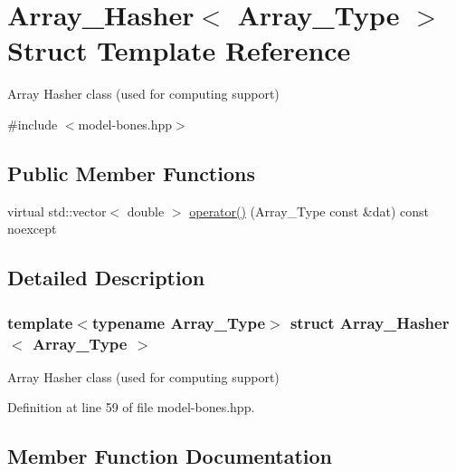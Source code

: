 \hypertarget{struct_array___hasher}{}\section{Array\+\_\+\+Hasher$<$ Array\+\_\+\+Type $>$ Struct Template Reference}
\label{struct_array___hasher}


Array Hasher class (used for computing support)  




{\ttfamily \#include $<$model-\/bones.\+hpp$>$}

\subsection*{Public Member Functions}
\begin{DoxyCompactItemize}
\item 
virtual std\+::vector$<$ double $>$ \hyperlink{struct_array___hasher_a096dc8674477127f45a54ff4dc4038b0}{operator()} (Array\+\_\+\+Type const \&dat) const noexcept
\end{DoxyCompactItemize}


\subsection{Detailed Description}
\subsubsection*{template$<$typename Array\+\_\+\+Type$>$\newline
struct Array\+\_\+\+Hasher$<$ Array\+\_\+\+Type $>$}

Array Hasher class (used for computing support) 



Definition at line 59 of file model-\/bones.\+hpp.



\subsection{Member Function Documentation}
\mbox{\label{struct_array___hasher_a096dc8674477127f45a54ff4dc4038b0}} 
